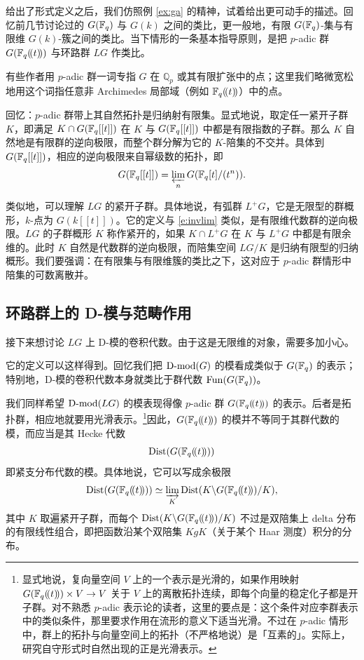 给出了形式定义之后，我们仿照例 \ref{ex:ga} 的精神，试着给出更可动手的描述。回忆前几节讨论过的 $G(\mathbb{F}_q)$ 与 $G(k)$ 之间的类比，更一般地，有限 $G(\mathbb{F}_q)$-集与有限维 $G(k)$-簇之间的类比。当下情形的一条基本指导原则，是把 $p$-adic 群 $G(\mathbb{F}_q(\!(t)\!))$ 与环路群 $LG$ 作类比。

\begin{re} 有些作者用 $p$-adic 群一词专指 $G$ 在 $\mathbb{Q}_p$ 或其有限扩张中的点；这里我们略微宽松地用这个词指任意非 Archimedes 局部域（例如 $\mathbb{F}_q(\!(t)\!)$）中的点。 \end{re}


回忆：$p$-adic 群带上其自然拓扑是归纳射有限集。显式地说，取定任一紧开子群 $K$，即满足 $K \cap G(\mathbb{F}_q[[t]])$ 在 $K$ 与 $G(\mathbb{F}_q[[t]])$ 中都是有限指数的子群。那么 $K$ 自然地是有限群的逆向极限，而整个群分解为它的 $K$-陪集的不交并。具体到 $G(\mathbb{F}_q[[t]])$，相应的逆向极限来自幂级数的拓扑，即
%
\begin{equation}
\label{e:invlim}
      G(\mathbb{F}_q[[t]]) = \varprojlim_n G(\mathbb{F}_q[t]/(t^n)).
\end{equation}
%


类似地，可以理解 $LG$ 的紧开子群。具体地说，有弧群 $L^+G$，它是无限型的群概形，$k$-点为 $G(k[[t]])$。它的定义与 \eqref{e:invlim} 类似，是有限维代数群的逆向极限。$LG$ 的子群概形 $K$ 称作紧开的，如果 $K \cap L^+G$ 在 $K$ 与 $L^+G$ 中都是有限余维的。此时 $K$ 自然是代数群的逆向极限，而陪集空间 $LG/K$ 是归纳有限型的归纳概形。我们要强调：在有限集与有限维簇的类比之下，这对应于 $p$-adic 群情形中陪集的可数离散并。



\subsection{环路群上的 D-模与范畴作用}

\ssszh 接下来想讨论 $LG$ 上 D-模的卷积代数。由于这是无限维的对象，需要多加小心。

它的定义可以这样得到。回忆我们把 $\operatorname{D-mod}(G)$ 的模看成类似于 $G(\mathbb{F}_q)$ 的表示；特别地，D-模的卷积代数本身就类比于群代数 $\operatorname{Fun}(G(\mathbb{F}_q))$。

我们同样希望 $\operatorname{D-mod}(LG)$ 的模表现得像 $p$-adic 群 $G(\mathbb{F}_q(\!(t)\!))$ 的表示。后者是拓扑群，相应地就要用光滑表示。\footnote{显式地说，复向量空间 $V$ 上的一个表示是光滑的，如果作用映射 $G(\mathbb{F}_q(\!(t)\!)) \times V \rightarrow V$ 关于 $V$ 上的离散拓扑连续，即每个向量的稳定化子都是开子群。对不熟悉 $p$-adic 表示论的读者，这里的要点是：这个条件对应李群表示中的类似条件，那里要求作用在流形的意义下适当光滑。不过在 $p$-adic 情形中，群上的拓扑与向量空间上的拓扑（不严格地说）是「互素的」。实际上，研究自守形式时自然出现的正是光滑表示。}因此，$G(\mathbb{F}_q(\!(t)\!))$ 的模并不等同于其群代数的模，而应当是其 Hecke 代数
$$\operatorname{Dist}(G(\mathbb{F}_q(\!(t)\!))) $$
即紧支分布代数的模。具体地说，它可以写成余极限
%
\begin{equation} \label{e:padicgroups}
\operatorname{Dist}(G(\mathbb{F}_q(\!(t)\!)))\simeq \varinjlim_K  \operatorname{Dist}( K \backslash G(\mathbb{F}_q(\!(t)\!)) / K),
\end{equation}
%
其中 $K$ 取遍紧开子群，而每个 $\operatorname{Dist}( K \backslash G(\mathbb{F}_q(\!(t)\!)) / K)$ 不过是双陪集上 delta 分布的有限线性组合，即把函数沿某个双陪集 $KgK$（关于某个 Haar 测度）积分的分布。


